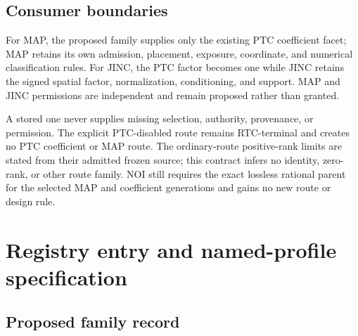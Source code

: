 \subsection{Consumer boundaries}

For MAP, the proposed family supplies only the existing PTC coefficient facet;
MAP retains its own admission, placement, exposure, coordinate, and numerical
classification rules. For JINC, the PTC factor becomes one while JINC retains
the signed spatial factor, normalization, conditioning, and support. MAP and
JINC permissions are independent and remain proposed rather than granted.

A stored one never supplies missing selection, authority, provenance, or
permission. The explicit PTC-disabled route remains RTC-terminal and creates
no PTC coefficient or MAP route. The ordinary-route positive-rank limits are
stated from their admitted frozen source; this contract infers no identity,
zero-rank, or other route family. NOI still requires the exact lossless
rational parent for the selected MAP and coefficient generations and gains no
new route or design rule.

\ifengineeringview

\section{Registry entry and named-profile specification}

\subsection{Proposed family record}

